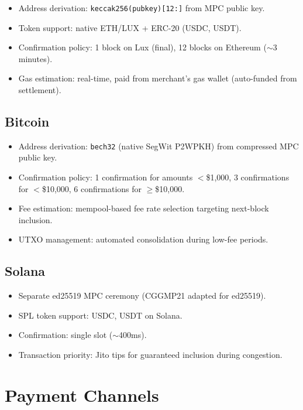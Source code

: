 \documentclass[11pt]{article}
\begin{document}
\begin{itemize}[leftmargin=1.4em]
    \item Address derivation: \texttt{keccak256(pubkey)[12:]} from MPC
    public key.
    \item Token support: native ETH/LUX + ERC-20 (USDC, USDT).
    \item Confirmation policy: 1 block on Lux (final), 12 blocks on
    Ethereum ($\sim$3 minutes).
    \item Gas estimation: real-time, paid from merchant's gas wallet
    (auto-funded from settlement).
\end{itemize}

\subsection{Bitcoin}

\begin{itemize}[leftmargin=1.4em]
    \item Address derivation: \texttt{bech32} (native SegWit P2WPKH) from
    compressed MPC public key.
    \item Confirmation policy: 1 confirmation for amounts $<$\$1,000, 3
    confirmations for $<$\$10,000, 6 confirmations for $\geq$\$10,000.
    \item Fee estimation: mempool-based fee rate selection targeting next-block
    inclusion.
    \item UTXO management: automated consolidation during low-fee periods.
\end{itemize}

\subsection{Solana}

\begin{itemize}[leftmargin=1.4em]
    \item Separate ed25519 MPC ceremony (CGGMP21 adapted for ed25519).
    \item SPL token support: USDC, USDT on Solana.
    \item Confirmation: single slot ($\sim$400ms).
    \item Transaction priority: Jito tips for guaranteed inclusion during
    congestion.
\end{itemize}

\section{Payment Channels}
\label{sec:channels}
\end{document}
